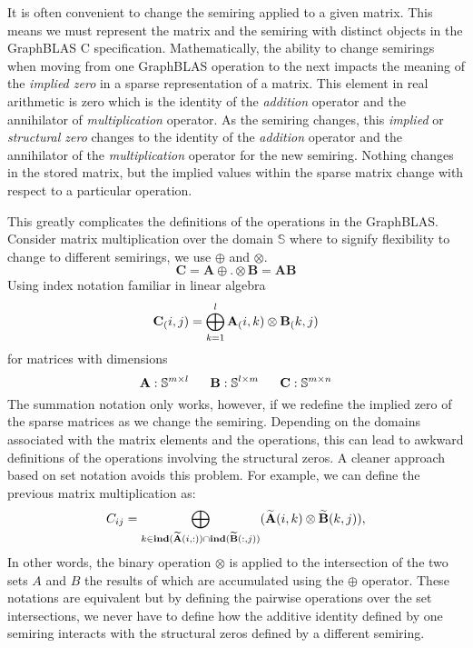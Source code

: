 It is often convenient to change the semiring applied
to a given matrix.  This means we must represent the matrix and the semiring with distinct objects 
in the GraphBLAS C specification.  Mathematically, the ability to change semirings 
when moving from one GraphBLAS operation to the next impacts the meaning of 
the \emph{implied zero} in a sparse representation of a matrix.
This element in real arithmetic is zero which is the 
identity of the \emph{addition} operator and the annihilator of
\emph{multiplication} operator.   As the semiring changes, this 
\emph{implied} or \emph{structural zero} changes to the identity of 
the \emph{addition} operator and the annihilator of the \emph{multiplication} 
operator for the new semiring.   Nothing changes in the
stored matrix, but the implied values within the sparse matrix change
with respect to a particular operation.  

This greatly complicates the definitions of the operations in the GraphBLAS.   
Consider matrix multiplication over the domain $\mathbb{S}$ where to signify 
flexibility to change to different semirings, we use $\oplus$ and $\otimes$.
 $$
   \mathbf{C} = \mathbf{A} {\oplus}.{\otimes} \mathbf{B} = \mathbf{A} \mathbf{B}
$$
Using index notation familiar in linear algebra
  $$
   {\bf C}_(i,j) = \bigoplus_{k=1}^l {\bf A}_(i,k) \otimes {\bf B}_(k,j)
  $$
for matrices with dimensions
$$
  {\bf A} : \mathbb{S}^{m \times l} ~~~~~
  {\bf B} : \mathbb{S}^{l \times m} ~~~~~
  {\bf C} : \mathbb{S}^{m \times n}
$$
The summation notation only works, however, if we redefine the implied zero of the 
sparse matrices as we change the semiring.   Depending on the domains associated with the
matrix elements and the operations, this can lead to awkward definitions of the
operations involving the structural zeros.  A cleaner approach based on set notation
avoids this problem.  For example, we can define the previous matrix multiplication
as:   
$$
C_{ij}
= \bigoplus_{k \in \bold{ind}({\bf \widetilde{A}}(i,:)) \cap
\bold{ind}({\bf \widetilde{B}}(:,j))} ({\bf \widetilde{A}}(i,k)
\otimes {\bf \widetilde{B}}(k,j)),
$$ 
In other words, the binary operation $\otimes$ is applied to the intersection of the 
two sets $A$ and $B$ the results of which are accumulated using the $\oplus$ operator.
These notations are equivalent but by defining the pairwise operations over
the set intersections, we never have to define how the additive identity defined by one
semiring interacts with the structural zeros defined by a different semiring.

